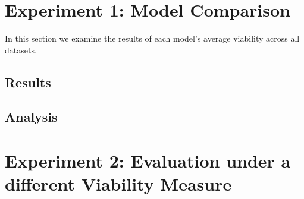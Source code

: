 \documentclass[12pt,a4paper]{report}
\begin{document}

% 

% 



% 
% 
% 
% 

\section{Experiment 1: Model Comparison}
\label{sec:overall}
In this section we examine the results of each model's average viability across all datasets. 
\subsection{Results}

\subsection{Analysis}



\section{Experiment 2: Evaluation under a different Viability Measure}
\end{document}
